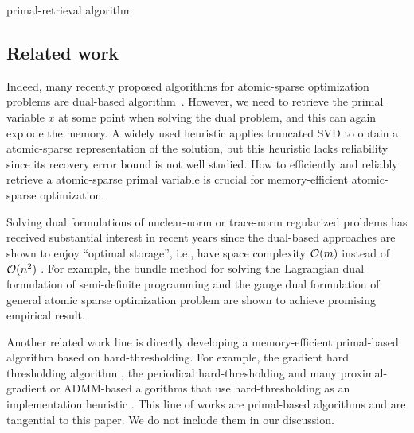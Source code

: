 \begin{algorithm}[t]
    \DontPrintSemicolon\setcounter{AlgoLine}{-1}
    \caption{primal-retrieval algorithm}\label{alg:primal_recover}
\end{algorithm}


\subsection{Related work}

Indeed, many recently proposed algorithms for atomic-sparse optimization problems are dual-based algorithm~\cite{fan2019bundle,DingYCTU21}.  However, we need to retrieve the primal variable $x$ at some point when solving the dual problem, and this can again explode the memory. A widely used heuristic applies truncated SVD \cite[Algorithm~6.4]{fan2019alignment} to obtain a atomic-sparse representation of the solution, but this heuristic lacks reliability since its recovery error bound is not well studied. How to efficiently and reliably retrieve a atomic-sparse primal variable is crucial for memory-efficient atomic-sparse optimization.

Solving dual formulations of nuclear-norm or trace-norm regularized problems has received substantial interest in recent years since the dual-based approaches are shown to enjoy ``optimal storage'', i.e., have space complexity $\mathcal{O}(m)$ instead of $\mathcal{O}( n^2 )$ \cite{DingYCTU21}. For example, the bundle method for solving the Lagrangian dual formulation of semi-definite programming \cite{helmberg2000spectral} and the gauge dual formulation of general atomic sparse optimization problem \cite{fan2019bundle} are shown to achieve promising empirical result.

Another related work line is directly developing a memory-efficient primal-based algorithm based on hard-thresholding. For example, the gradient hard thresholding algorithm \cite{YuanLZ17}, the periodical hard-thresholding \cite{Allen-ZhuHHL17} and many proximal-gradient or ADMM-based algorithms that use hard-thresholding as an implementation heuristic \cite{mazumder2010spectral,Lin11,hsieh2014nuclear}. This line of works are primal-based algorithms and are tangential to this paper. We do not include them in our discussion. 

